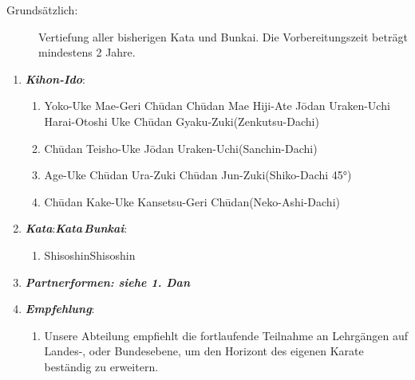 \documentclass[a5paper,landscape,DIV=calc,11pt,notitlepage]{scrartcl}
\newcommand{\bull}{\,\textbullet\,}
\begin{document}
\begin{tcolorbox}[colback=white,colframe=black,coltitle=white,adjusted title=2. Dan: Schwarz - Yudansha\textit{ - \frqq Der starke Dan\flqq}]
	\renewcommand{\labelenumi}{\alph{enumi}.)}
	\renewcommand{\labelenumii}{\arabic*.}
	{\footnotesize 	\begin{description}
			\item[Grundsätzlich:]Vertiefung aller bisherigen Kata und Bunkai. Die Vorbereitungszeit beträgt mindestens 2 Jahre.
	\end{description}}
	\begin{enumerate}[nosep]
		\item \textit{\textbf{Kihon-Ido}}:
		\begin{enumerate}[nosep]
			\item Yoko-Uke\bull Mae-Geri Ch\={u}dan\bull Ch\={u}dan Mae Hiji-Ate\bull J\={o}dan Uraken-Uchi\\Harai-Otoshi	Uke\bull Ch\={u}dan Gyaku-Zuki\tabto{335pt}(Zenkutsu-Dachi)
			\item Ch\={u}dan Teisho-Uke\bull J\={o}dan Uraken-Uchi\tabto{335pt}(Sanchin-Dachi)
			\item Age-Uke\bull Ch\={u}dan Ura-Zuki\bull Ch\={u}dan Jun-Zuki\tabto{335pt}(Shiko-Dachi 45°)
			\item Ch\={u}dan Kake-Uke\bull Kansetsu-Geri Ch\={u}dan\tabto{335pt}(Neko-Ashi-Dachi)
		\end{enumerate}
		\vspace{12pt}
		\item \textit{\textbf{Kata}}:\tabto{200pt}\textit{\textbf{Kata\,Bunkai}}:
		\begin{enumerate}[nosep]
			\item Shisoshin\tabto{200pt}Shisoshin
		\end{enumerate}
		\vspace{12pt}
		\item \textit{\textbf{Partnerformen: siehe 1. Dan}}
		\vspace{12pt}
		\item \textit{\textbf{Empfehlung}}:
		\begin{enumerate}[nosep]
			\item[] Unsere Abteilung empfiehlt die fortlaufende Teilnahme an Lehrgängen auf Landes-, oder Bundesebene, um den Horizont des eigenen Karate beständig zu erweitern.
		\end{enumerate}
	\end{enumerate}
\end{tcolorbox}
\end{document}
